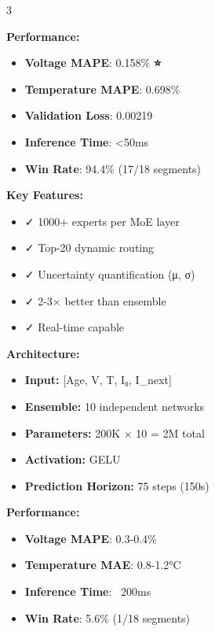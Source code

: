 \documentclass[final,a0paper,portrait]{a0poster}
\begin{document}
\begin{multicols}{3}
\begin{bluebox}[title=🧠 Model 1: MoE-Enhanced Transformer]
\vspace{0.5cm}
\textbf{Performance:}
\begin{itemize}
    \item \textbf{Voltage MAPE}: 0.158\% \textbf{⭐}
    \item \textbf{Temperature MAPE}: 0.698\%
    \item \textbf{Validation Loss}: 0.00219
    \item \textbf{Inference Time}: <50ms
    \item \textbf{Win Rate}: 94.4\% (17/18 segments)
\end{itemize}

\textbf{Key Features:}
\begin{itemize}
    \item ✓ 1000+ experts per MoE layer
    \item ✓ Top-20 dynamic routing
    \item ✓ Uncertainty quantification (μ, σ)
    \item ✓ 2-3× better than ensemble
    \item ✓ Real-time capable
\end{itemize}
\end{bluebox}

\vspace{1cm}

\begin{bluebox}[title=🔬 Model 2: Deep Ensemble]
\large
\textbf{Architecture:}
\begin{itemize}
    \item \textbf{Input:} [Age, V, T, I₀, I\_next]
    \item \textbf{Ensemble:} 10 independent networks
    \item \textbf{Parameters:} 200K × 10 = 2M total
    \item \textbf{Activation:} GELU
    \item \textbf{Prediction Horizon:} 75 steps (150s)
\end{itemize}

\textbf{Performance:}
\begin{itemize}
    \item \textbf{Voltage MAPE}: 0.3-0.4\%
    \item \textbf{Temperature MAE}: 0.8-1.2°C
    \item \textbf{Inference Time}: ~200ms
    \item \textbf{Win Rate}: 5.6\% (1/18 segments)
\end{itemize}


\end{bluebox}
\end{multicols}
\end{document}
